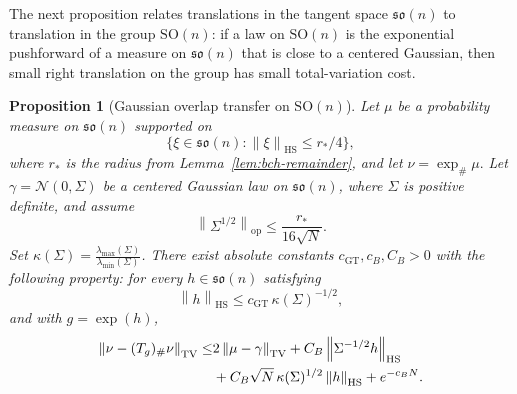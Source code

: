 \documentclass[11pt, reqno]{amsart}
\numberwithin{equation}{section}
\newtheorem{proposition}{Proposition}
\theoremstyle{remark}
\newcommand{\1}{\mathbf{1}}
\newcommand{\SO}{\mathrm{SO}}
\newcommand{\so}{\mathfrak{so}}
\newcommand{\HS}{\mathrm{HS}}
\newcommand{\op}{\mathrm{op}}
\newcommand{\TV}{\mathrm{TV}}
\newcommand{\norm}[1]{\left\lVert #1\right\rVert}
\begin{document}
The next proposition relates translations in the tangent space $\so(n)$ to translation in the group $\SO(n)$: if a law on $\SO(n)$ is the exponential pushforward of a measure on
$\so(n)$ that is close to a centered Gaussian, then small right translation on
the group has small total-variation cost.

\begin{proposition}[Gaussian overlap transfer on $\SO(n)$]
\label{prop:gaussian-bch}
Let $\mu$ be a probability measure on $\so(n)$ supported on
\begin{equation} \label{SupportHyp1}
\{\xi\in \so(n): \norm{\xi}_{\HS}\le r_\ast/4\},
\end{equation}
 where $r_\ast$ is the radius from Lemma~\ref{lem:bch-remainder},
and let $\nu=\exp_\#\mu.$
Let $\gamma=\mathcal N(0,\Sigma)$
be a centered Gaussian law on $\so(n)$, where $\Sigma$ is positive definite, and
assume
\begin{equation}
\label{eq:gaussian-transfer-chart}
\norm{\Sigma^{1/2}}_{\op}\le \frac{r_\ast}{16\sqrt N}.
\end{equation}
Set $\kappa(\Sigma)=\frac{\lambda_{\max}(\Sigma)}{\lambda_{\min}(\Sigma)}$.
There exist absolute constants $c_{\mathrm{GT}},c_B,C_B>0$ with the following
property: for every $h\in \so(n)$ satisfying
\begin{equation}
\label{eq:gaussian-transfer-h-small}
\norm{h}_{\HS}\le c_{\mathrm{GT}}\,\kappa(\Sigma)^{-1/2},
\end{equation}
and with $g=\exp(h)$, 
\begin{align}
\norm{\nu-(T_g)_\#\nu}_{\TV}
\le
&2\norm{\mu-\gamma}_{\TV}
+
C_B\norm{\Sigma^{-1/2}h}_{\HS} \notag \\
&+
C_B\sqrt N\,\kappa(\Sigma)^{1/2}\norm{h}_{\HS}
+
e^{-c_BN}.\label{eq:gaussian-bch}
\end{align}
\end{proposition}
\end{document}
